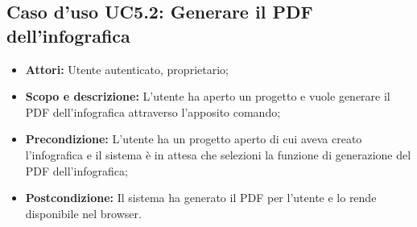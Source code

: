 	\subsection{Caso d'uso UC5.2: Generare il PDF dell'infografica}
	\begin{itemize}
		\item \textbf{Attori:} Utente autenticato, proprietario;
		\item \textbf{Scopo e descrizione:} L'utente ha aperto un progetto e vuole generare il PDF dell'infografica attraverso l'apposito comando;
		\item \textbf{Precondizione:} L'utente ha un progetto aperto di cui aveva creato l'infografica e il sistema è in attesa che selezioni la funzione di generazione del PDF dell'infografica;
		\item \textbf{Postcondizione:} Il sistema ha generato il PDF per l'utente e lo rende disponibile nel browser.
	\end{itemize}